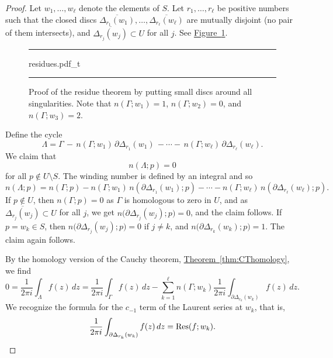 \documentclass[12pt,openany]{book}
\theoremstyle{plain}
\theoremstyle{remark}
\theoremstyle{definition}
\newenvironment{myfig}{%
\begin{figure}[h!t]
\noindent\rule{\textwidth}{0.5pt}\vspace{12pt}\par\centering}%
{\par\noindent\rule{\textwidth}{0.5pt}
\end{figure}}
\theoremstyle{exercise}
\theoremstyle{example}
\newcommand{\figureref}[1]{\hyperref[#1]{Figure~\ref*{#1}}}
\newcommand{\thmref}[1]{\hyperref[#1]{Theorem~\ref*{#1}}}
\begin{document}
\begin{proof}
Let $w_1,\ldots,w_\ell$ denote the elements of $S$.
Let $r_1,\ldots,r_\ell$ be positive numbers such that
the closed discs
$\overline{\Delta_{r_1}(w_1)},\ldots, \overline{\Delta_{r_\ell}(w_\ell)}$
are mutually disjoint (no pair of them intersects), and
$\overline{\Delta_{r_j}(w_j)} \subset U$ for all $j$.
See \figureref{fig:residues}.

\begin{myfig}
{residues.pdf_t}
\caption{Proof of the residue theorem by putting small discs around all
singularities.  Note that $n(\Gamma;w_1) = 1$, $n(\Gamma;w_2)=0$, and
$n(\Gamma;w_3) = 2$.\label{fig:residues}}
\end{myfig}

Define the cycle
\begin{equation*}
\Lambda = \Gamma \,
- \, n(\Gamma;w_1) \, \partial \Delta_{r_1} (w_1)
\, -
\cdots
- \, n(\Gamma;w_\ell) \, \partial \Delta_{r_\ell} (w_\ell) .
\end{equation*}
We claim that
\begin{equation*}
n(\Lambda;p) = 0
\end{equation*}
for all $p \notin U \setminus S$.
The winding number is defined by an integral and so
\begin{equation*}
n(\Lambda;p) = n(\Gamma;p)
- n(\Gamma;w_1) \, n(\partial \Delta_{r_1} (w_1) ; p)
-
\cdots
- n(\Gamma;w_\ell) \, n(\partial \Delta_{r_\ell} (w_\ell) ; p) .
\end{equation*}
If $p \notin U$, then $n(\Gamma;p) = 0$ as $\Gamma$ is homologous to zero in
$U$,
and as 
$\overline{\Delta_{r_j}(w_j)} \subset U$ for all $j$, we get
$n\bigl( \partial \Delta_{r_j}(w_j) ; p\bigr) = 0$, and the claim follows.
If $p = w_k \in S$, then 
$n\bigl( \partial \Delta_{r_j}(w_j) ; p\bigr) = 0$ if $j \neq k$,
and
$n\bigl( \partial \Delta_{r_k}(w_k) ; p\bigr) = 1$.
The claim again follows.

By the homology version of the Cauchy theorem, \thmref{thm:CThomology}, we find
\begin{equation*}
0 = 
\frac{1}{2 \pi i}
\int_\Lambda f(z) \, dz
=
\frac{1}{2 \pi i}
\int_\Gamma f(z) \, dz
-
\sum_{k=1}^\ell
n(\Gamma;w_k)
\frac{1}{2 \pi i}
\int_{\partial \Delta_{r_k}(w_k)} f(z) \, dz .
\end{equation*}
We recognize the formula for the $c_{-1}$ term of the Laurent series at
$w_k$, that is,
\begin{equation*}
\frac{1}{2 \pi i}
\int_{\partial \Delta_{r_k}(w_k)} f(z) \, dz
= \operatorname{Res}(f;w_k) .  \qedhere
\end{equation*}
\end{proof}
\end{document}
